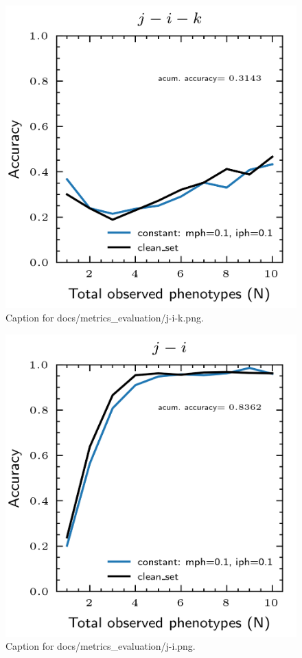 \documentclass{article}
\begin{document}
\begin{figure}[h] \centering \includegraphics{docs/metrics_evaluation/j-i-k.png} \caption{Caption for docs/metrics_evaluation/j-i-k.png.} \end{figure}
\begin{figure}[h] \centering \includegraphics{docs/metrics_evaluation/j-i.png} \caption{Caption for docs/metrics_evaluation/j-i.png.} \end{figure}
\end{document}
